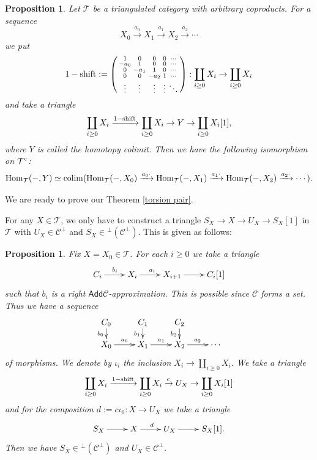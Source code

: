 \documentclass[a4paper,reqno]{amsart}
\newtheorem{proposition}[theorem]{Proposition}
\theoremstyle{definition}
\newcommand{\CC}{{\mathcal C}}
\newcommand{\TT}{{\mathcal T}}
\newcommand{\Add}{\mathsf{Add}}
\newcommand{\Hom}{\operatorname{Hom}\nolimits}
\begin{document}
\begin{proposition}\label{hocolim}
Let $\TT$ be a triangulated category with arbitrary coproducts.
For a sequence 
\[X_0\xrightarrow{a_0}X_1\xrightarrow{a_1}X_2\xrightarrow{a_2}\cdots\]
we put
\[1-{\rm shift}:=\left(\begin{smallmatrix}
1&0&0&0&\cdots\\
-a_0&1&0&0&\cdots\\
0&-a_1&1&0&\cdots\\
0&0&-a_2&1&\cdots\\
\vdots&\vdots&\vdots&\vdots&\ddots
\end{smallmatrix}\right):\coprod_{i\ge0}X_i\to\coprod_{i\ge0}X_i\]
and take a triangle
\[\coprod_{i\ge0}X_i\xrightarrow{1-{\rm shift}}\coprod_{i\ge0}X_i\to Y\to\coprod_{i\ge0}X_i[1],\]
where $Y$ is called the \emph{homotopy colimit}.
Then we have the following isomorphism on $\TT^{\rm c}$:
\[\Hom_{\TT}(-,Y)\simeq{\rm colim}(\Hom_{\TT}(-,X_0)\xrightarrow{a_0\cdot}
\Hom_{\TT}(-,X_1)\xrightarrow{a_1\cdot}\Hom_{\TT}(-,X_2)\xrightarrow{a_2\cdot}\cdots).\]
\end{proposition}

We are ready to prove our Theorem \ref{torsion pair}.

For any $X\in\TT$, we only have to construct a triangle
$S_X\to X\to U_X\to S_X[1]$ in $\TT$ with $U_X\in\CC^\perp$ and $S_X\in{}^\perp(\CC^\perp)$.
This is given as follows:

\begin{proposition}\label{construction}
Fix $X=X_0\in\TT$. For each $i\ge0$ we take a triangle
\begin{equation}\label{approximation}
\xymatrix{
C_i\ar[r]^{b_i}&X_i\ar[r]^{a_i}&X_{i+1}\ar[r]&C_i[1]
}\end{equation}
such that $b_i$ is a right $\Add\CC$-approximation.
This is possible since $\CC$ forms a set.
Thus we have a sequence
\[\xymatrix@R=.4cm{
C_0\ar_{b_0}[d]&C_1\ar_{b_1}[d]&C_2\ar_{b_2}[d]\\
X_0\ar^{a_0}[r]&X_1\ar^{a_1}[r]&X_2\ar^{a_2}[r]&\cdots
}\]
of morphisms.
We denote by $\iota_i$ the inclusion $X_i\to\coprod_{i\ge0}X_i$.
We take a triangle
\begin{equation}\label{hocolim triangle}
\coprod_{i\ge0}X_i\xrightarrow{1-{\rm shift}}\coprod_{i\ge0}X_i\xrightarrow{c}U_X\to\coprod_{i\ge0}X_i[1]
\end{equation}
and for the composition $d:=c\iota_0:X\to U_X$ we take a triangle
\begin{equation}\label{torsion pair triangle}
\xymatrix{S_X\ar[r]&X\ar[r]^d&U_X\ar[r]&S_X[1].}
\end{equation}
Then we have $S_X\in{}^\perp(\CC^\perp)$ and $U_X\in\CC^\perp$.
\end{proposition}
\end{document}
